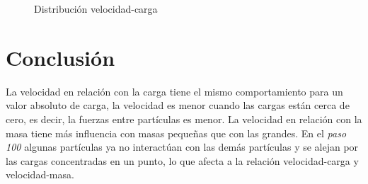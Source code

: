 \documentclass{article}
\begin{document}
\begin{figure}[h!]
\caption{Distribución velocidad-carga}\label{fig5}
\end{figure}



\newpage
\section{Conclusión}
La velocidad en relación con la carga tiene el mismo comportamiento para un valor absoluto de carga, la velocidad es menor cuando las cargas están cerca de cero, es decir, la fuerzas entre partículas es menor. La velocidad en relación con la masa tiene más influencia con masas pequeñas que con las grandes.
En el \textit{paso 100} algunas partículas ya no interactúan con las demás partículas y se alejan por las cargas concentradas en un punto, lo que afecta a la relación velocidad-carga y velocidad-masa.

\newpage


\end{document}
